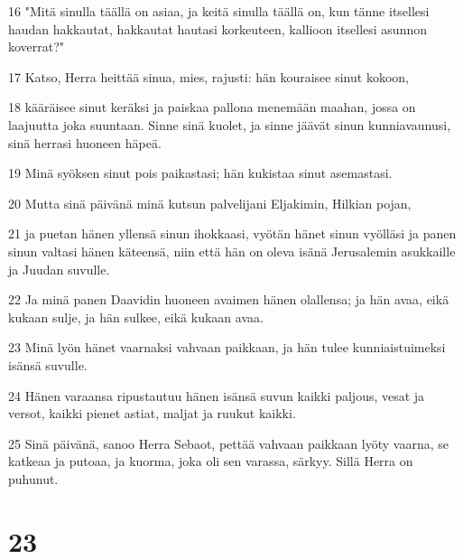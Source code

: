 \par 16 "Mitä sinulla täällä on asiaa, ja keitä sinulla täällä on, kun tänne itsellesi haudan hakkautat, hakkautat hautasi korkeuteen, kallioon itsellesi asunnon koverrat?"
\par 17 Katso, Herra heittää sinua, mies, rajusti: hän kouraisee sinut kokoon,
\par 18 kääräisee sinut keräksi ja paiskaa pallona menemään maahan, jossa on laajuutta joka suuntaan. Sinne sinä kuolet, ja sinne jäävät sinun kunniavaunusi, sinä herrasi huoneen häpeä.
\par 19 Minä syöksen sinut pois paikastasi; hän kukistaa sinut asemastasi.
\par 20 Mutta sinä päivänä minä kutsun palvelijani Eljakimin, Hilkian pojan,
\par 21 ja puetan hänen yllensä sinun ihokkaasi, vyötän hänet sinun vyölläsi ja panen sinun valtasi hänen käteensä, niin että hän on oleva isänä Jerusalemin asukkaille ja Juudan suvulle.
\par 22 Ja minä panen Daavidin huoneen avaimen hänen olallensa; ja hän avaa, eikä kukaan sulje, ja hän sulkee, eikä kukaan avaa.
\par 23 Minä lyön hänet vaarnaksi vahvaan paikkaan, ja hän tulee kunniaistuimeksi isänsä suvulle.
\par 24 Hänen varaansa ripustautuu hänen isänsä suvun kaikki paljous, vesat ja versot, kaikki pienet astiat, maljat ja ruukut kaikki.
\par 25 Sinä päivänä, sanoo Herra Sebaot, pettää vahvaan paikkaan lyöty vaarna, se katkeaa ja putoaa, ja kuorma, joka oli sen varassa, särkyy. Sillä Herra on puhunut.

\chapter{23}

